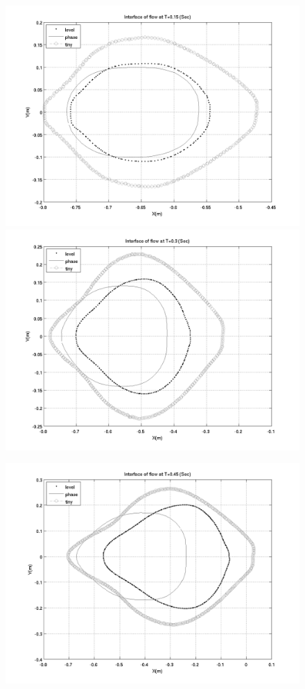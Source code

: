 \documentclass[letterpaper,10pt]{article}
\begin{document}
\begin{figure}[H]
  \begin{minipage}[b]{.48\linewidth}
    \centering
    \includegraphics[width=1\textwidth]{IMAGES/interface15.png}
    \includegraphics[width=1\textwidth]{IMAGES/interface30.png}
  \end{minipage}
  \begin{minipage}[b]{.48 \linewidth}
    \centering
    \includegraphics[width=1\textwidth]{IMAGES/interface45.png}

\end{minipage}
\end{figure}
\end{document}
